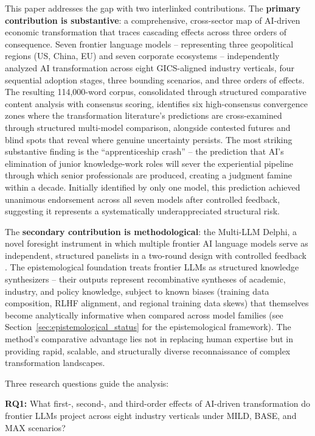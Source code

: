 \documentclass[preprint,review,12pt]{elsarticle}
\begin{document}
This paper addresses the gap with two interlinked contributions. The \textbf{primary contribution is substantive}: a comprehensive, cross-sector map of AI-driven economic transformation that traces cascading effects across three orders of consequence. Seven frontier language models -- representing three geopolitical regions (US, China, EU) and seven corporate ecosystems -- independently analyzed AI transformation across eight GICS-aligned industry verticals, four sequential adoption stages, three bounding scenarios, and three orders of effects. The resulting 114,000-word corpus, consolidated through structured comparative content analysis with consensus scoring, identifies six high-consensus convergence zones where the transformation literature's predictions are cross-examined through structured multi-model comparison, alongside contested futures and blind spots that reveal where genuine uncertainty persists. The most striking substantive finding is the ``apprenticeship crash'' -- the prediction that AI's elimination of junior knowledge-work roles will sever the experiential pipeline through which senior professionals are produced, creating a judgment famine within a decade. Initially identified by only one model, this prediction achieved unanimous endorsement across all seven models after controlled feedback, suggesting it represents a systematically underappreciated structural risk.

The \textbf{secondary contribution is methodological}: the Multi-LLM Delphi, a novel foresight instrument in which multiple frontier AI language models serve as independent, structured panelists in a two-round design with controlled feedback \citep{linstone1975delphi, gordon2006rtdelphi}. The epistemological foundation treats frontier LLMs as structured knowledge synthesizers -- their outputs represent recombinative syntheses of academic, industry, and policy knowledge, subject to known biases (training data composition, RLHF alignment, and regional training data skews) that themselves become analytically informative when compared across model families (see Section~\ref{sec:epistemological_status} for the epistemological framework). The method's comparative advantage lies not in replacing human expertise but in providing rapid, scalable, and structurally diverse reconnaissance of complex transformation landscapes.

Three research questions guide the analysis:

\textbf{RQ1:} What first-, second-, and third-order effects of AI-driven transformation do frontier LLMs project across eight industry verticals under MILD, BASE, and MAX scenarios?
\end{document}
